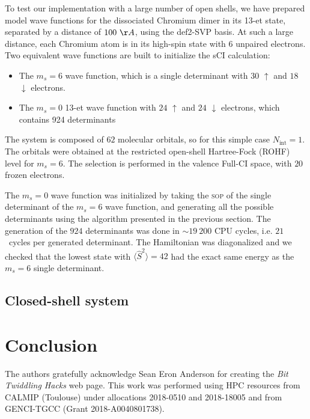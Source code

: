 \documentclass[aip,jcp,reprint,showkeys]{revtex4-1}
\newcommand{\stwo}{\hat{S}^2}
\newcommand{\up}{\uparrow}
\newcommand{\dn}{\downarrow}
\newcommand{\Nint}{{N_\text{int}}}
\newcommand{\sop}{\textsc{sop}}
\begin{document}
To test our implementation with a large number of open shells, we have prepared
model wave functions for the dissociated Chromium dimer in its 13-et state, separated by a
distance of $100~\AA$, using the def2-SVP basis.\cite{Weigend_2005}
At such a large distance, each Chromium atom is in its high-spin state with $6$
unpaired electrons. Two equivalent wave functions are built to initialize the sCI
calculation:
\begin{itemize}
\item The $m_s=6$ wave function, which is a single determinant with $30$ $\up$
      and $18$ $\dn$ electrons.
\item The $m_s=0$ 13-et wave function with $24$ $\up$ and $24$ $\dn$ electrons, which
      contains 924 determinants
\end{itemize}
The system is composed of $62$ molecular orbitals, so for this simple case $\Nint=1$.
The orbitals were obtained at the restricted open-shell Hartree-Fock (ROHF) level
for $m_s=6$.
The selection is performed in the valence Full-CI space, with $20$ frozen electrons.



The $m_s=0$ wave function was initialized by taking the {\sop} of the single determinant
of the $m_s=6$ wave function, and generating all the possible determinants using 
the algorithm presented in the previous section.
The generation of the $924$ determinants was done in $\sim 19~200$ CPU cycles,
i.e. $21$~cycles per generated determinant. The Hamiltonian was diagonalized and
we checked that the lowest state with $\langle \stwo \rangle = 42$ had the exact
same energy as the $m_s=6$ single determinant.


\subsection{Closed-shell system}


\section{Conclusion}


\begin{acknowledgments}
The authors gratefully acknowledge Sean Eron Anderson for creating the 
\emph{Bit Twiddling Hacks} web page.
This work was performed using HPC resources from CALMIP (Toulouse) under
allocations 2018-0510 and 2018-18005 and from GENCI-TGCC (Grant
2018-A0040801738).
\end{acknowledgments}



\end{document}
